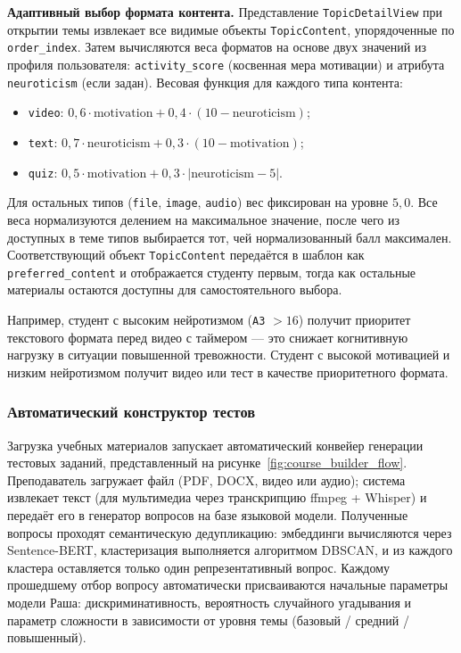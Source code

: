 \textbf{Адаптивный выбор формата контента.}
Представление \texttt{TopicDetailView} при открытии темы извлекает
все видимые объекты \texttt{TopicContent}, упорядоченные по
\texttt{order\_index}. Затем вычисляются веса форматов на основе двух
значений из профиля пользователя: \texttt{activity\_score} (косвенная
мера мотивации) и атрибута \texttt{neuroticism} (если задан). Весовая
функция для каждого типа контента:

\begin{itemize}
  \item \texttt{video}: $0{,}6 \cdot \text{motivation} + 0{,}4 \cdot (10 - \text{neuroticism})$;
  \item \texttt{text}: $0{,}7 \cdot \text{neuroticism} + 0{,}3 \cdot (10 - \text{motivation})$;
  \item \texttt{quiz}: $0{,}5 \cdot \text{motivation} + 0{,}3 \cdot |\text{neuroticism} - 5|$.
\end{itemize}

Для остальных типов (\texttt{file}, \texttt{image}, \texttt{audio})
вес фиксирован на уровне $5{,}0$. Все веса нормализуются делением
на максимальное значение, после чего из доступных в теме типов
выбирается тот, чей нормализованный балл максимален. Соответствующий
объект \texttt{TopicContent} передаётся в шаблон как
\texttt{preferred\_content} и отображается студенту первым, тогда как
остальные материалы остаются доступны для самостоятельного выбора.

Например, студент с высоким нейротизмом (\texttt{A3} $> 16$) получит
приоритет текстового формата перед видео с таймером — это снижает
когнитивную нагрузку в ситуации повышенной тревожности. Студент с
высокой мотивацией и низким нейротизмом получит видео или тест в
качестве приоритетного формата.

\subsubsection{Автоматический конструктор тестов}

Загрузка учебных материалов запускает автоматический конвейер
генерации тестовых заданий, представленный на
рисунке~\ref{fig:course_builder_flow}. Преподаватель загружает
файл (PDF, DOCX, видео или аудио); система извлекает текст
(для мультимедиа через транскрипцию ffmpeg + Whisper) и
передаёт его в генератор вопросов на базе языковой модели.
Полученные вопросы проходят семантическую дедупликацию:
эмбеддинги вычисляются через Sentence-BERT, кластеризация
выполняется алгоритмом DBSCAN, и из каждого кластера
оставляется только один репрезентативный вопрос. Каждому
прошедшему отбор вопросу автоматически присваиваются
начальные параметры модели Раша: дискриминативность,
вероятность случайного угадывания и параметр сложности
в зависимости от уровня темы (базовый / средний / повышенный).

